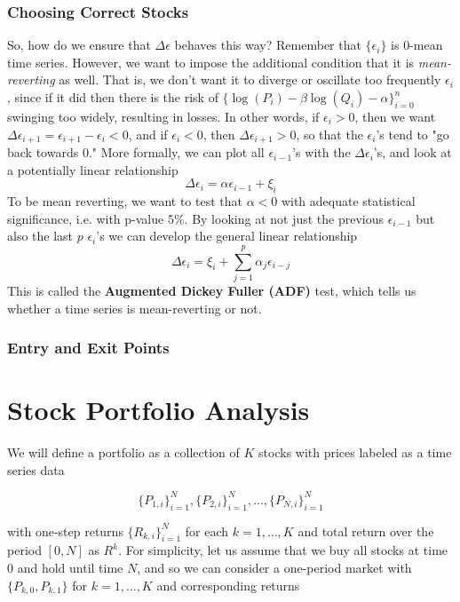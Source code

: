 \documentclass{article}
\begin{document}
    \subsubsection{Choosing Correct Stocks}

      So, how do we ensure that $\Delta \epsilon$ behaves this way? Remember that $\{\epsilon_i\}$ is $0$-mean time series. However, we want to impose the additional condition that it is \textit{mean-reverting} as well. That is, we don't want it to diverge or oscillate too frequently $\epsilon_i$, since if it did then there is the risk of $\{\log(P_i) - \beta \log(Q_i) - \alpha\}_{i=0}^n$ swinging too widely, resulting in losses. In other words, if $\epsilon_i > 0$, then we want $\Delta \epsilon_{i + 1} = \epsilon_{i+1} - \epsilon_i < 0$, and if $\epsilon_i < 0$, then $\Delta \epsilon_{i+1} > 0$, so that the $\epsilon_i$'s tend to "go back towards $0$." More formally, we can plot all $\epsilon_{i-1}$'s with the $\Delta \epsilon_i$'s, and look at a potentially linear relationship 
      \[\Delta \epsilon_i = \alpha \epsilon_{i-1} + \xi_i\]
      To be mean reverting, we want to test that $\alpha < 0$ with adequate statistical significance, i.e. with p-value $5\%$. By looking at not just the previous $\epsilon_{i-1}$ but also the last $p$ $\epsilon_i$'s we can develop the general linear relationship 
      \[\Delta \epsilon_i = \xi_i + \sum_{j=1}^p \alpha_j \epsilon_{i - j}\]
      This is called the \textbf{Augmented Dickey Fuller (ADF)} test, which tells us whether a time series is mean-reverting or not. 

    \subsubsection{Entry and Exit Points}

\section{Stock Portfolio Analysis}

  We will define a portfolio as a collection of $K$ stocks with prices labeled as a time series data 
  
  \begin{equation}
    \{P_{1,i}\}_{i=1}^N, \{P_{2,i}\}_{i = 1}^N, \ldots, \{P_{N,i}\}_{i=1}^N
  \end{equation}

  with one-step returns $\{R_{k, i}\}_{i = 1}^{N}$ for each $k = 1, \ldots, K$ and total return over the period $[0, N]$ as $R^k$. For simplicity, let us assume that we buy all stocks at time $0$ and hold until time $N$, and so we can consider a one-period market with $\{P_{k, 0}, P_{k, 1}\}$ for $k = 1, \ldots, K$ and corresponding returns 
\end{document}
